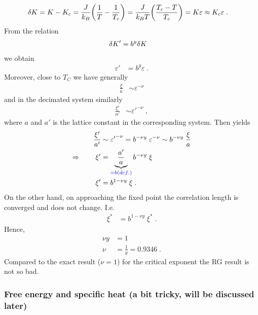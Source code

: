 %
\begin{align*}
\var K &= K - K_{c} = \frac{J}{k_{B} } \qty(\frac{1}{T} - \frac{1}{T_{c}})
= \frac{J}{k_{B} T} \qty(\frac{T_{c}-T}{T_{c}}) = K \varepsilon \approx K_{c} \varepsilon\;.
\end{align*}
%
From the relation
%
\begin{align*}
\var K' &= b^{y} \var K
\end{align*}
%
we obtain
\begin{align}\label{eq:epsilon}
\varepsilon' &= b^{y} \varepsilon\;.
\end{align}
%
Moreover, close to $T_{C}$ we have generally
%
\begin{align*}
\frac{\xi}{a} &\sim \varepsilon^{-\nu}
\end{align*}
%
and in the decimated system similarly
%
\begin{align*}
\frac{\xi'}{a'} &\sim {\varepsilon'}^{-\nu}\;,
\end{align*}
%
where $a$ and $a'$ is the lattice constant in the corresponding system.
Then  yields
%
\begin{align*}
\frac{\xi'}{a'} &\sim  {\varepsilon'}^{-\nu} =  b^{-\nu y}\;\varepsilon^{-\nu}\sim   b^{-\nu y}\;\frac{\xi}{a}\\
\Rightarrow\qquad \xi' &=  \underbrace{
\frac{a'}{a}
}_{\color{blue} = b (def.)} b^{- \nu y} \;\xi\\
\xi' &= b^{1 - \nu y} \;\xi\;.
\end{align*}
%
On the other hand, on approaching the fixed point the correlation length is converged and does not change. I.e.
%
\begin{align*}
\xi^{*} &= b^{1 - \nu y} \;\xi^{*}\;.
\end{align*}
%
Hence,
%
\begin{align*}
\nu y  &= 1\\
\nu &= \frac{1}{y} = 0.9346\;.
\end{align*}
%
Compared to the exact result ($\nu=1$) for the critical exponent the RG result is not so bad.




\subsubsection{Free energy and specific heat (a bit tricky, will be discussed later)}



